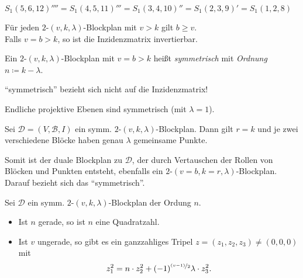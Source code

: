 \documentclass{cheat-sheet}
\newcommand{\Design}{\mathcal{D}} %
\newcommand{\Blocks}{\mathcal{B}} %
\begin{document}
\begin{bsp}
  $S_1(5,6,12)'''' = S_1(4,5,11)''' = S_1(3,4,10)'' = S_1(2,3,9)' = S_1(1,2,8)$
\end{bsp}



\begin{lem}
  Für jeden $2$-$(v,k,\lambda)$-Blockplan mit $v \!>\! k$ gilt $b \geq v$. \\
  Falls $v = b > k$, so ist die Inzidenzmatrix invertierbar.
\end{lem}

\begin{defn}
  Ein $2$-$(v, k, \lambda)$-Blockplan mit $v = b > k$ heißt \emph{symmetrisch} mit \emph{Ordnung} $n \coloneqq k - \lambda$.
\end{defn}

\begin{acht}
  "`symmetrisch"' bezieht sich nicht auf die Inzidenzmatrix!
\end{acht}

\begin{bsp}
  Endliche projektive Ebenen sind symmetrisch (mit $\lambda = 1$).
\end{bsp}

\begin{satz}
  Sei $\Design = (V, \Blocks, I)$ ein symm. $2$-$(v, k, \lambda)$-Blockplan.
  Dann gilt $r = k$ und je zwei verschiedene Blöcke haben genau $\lambda$ gemeinsame Punkte.
\end{satz}

\begin{bem}
  Somit ist der duale Blockplan zu $\Design$, der durch Vertauschen der Rollen von Blöcken und Punkten entsteht, ebenfalls ein $2$-$(v = b, k = r, \lambda)$-Blockplan.
  Darauf bezieht sich das "`symmetrisch"'.
\end{bem}

\begin{satz}
  Sei $\Design$ ein symm. $2$-$(v, k, \lambda)$-Blockplan der Ordung $n$.
  \begin{itemize}
    \item Ist $n$ gerade, so ist $n$ eine Quadratzahl.
    \item Ist $v$ ungerade, so gibt es ein ganzzahliges Tripel $z = (z_1, z_2, z_3) \neq (0, 0, 0)$ mit
    \[ z_1^2 = n \cdot z_2^2 + (-1)^{\nicefrac{(v-1)}{2}} \lambda \cdot z_3^2. \]
  \end{itemize}
\end{satz}
\end{document}

